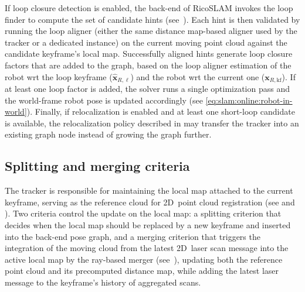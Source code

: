 If loop closure detection is enabled, the back-end of RicoSLAM invokes the loop
finder to compute the set of candidate hints
(see~).
Each hint is then validated by running the loop aligner (either the same
distance map-based aligner used by the tracker or a dedicated instance)
on the current moving point cloud against the candidate keyframe's local
map. Successfully aligned hints generate loop closure factors that are added
to the graph, based on the loop aligner estimation of the robot \gls{wrt} the
loop keyframe ($\hat{\mathbf{x}}_{R,\ell}$) and the robot \gls{wrt} the current
one ($\mathbf{x}_{R,\mathrm{kf}}$).
If at least one loop factor is added,
the solver runs a single optimization pass and the world-frame robot pose
is updated accordingly (see \eqref{eq:slam:online:robot-in-world}).
Finally, if relocalization is enabled and at least one
short-loop candidate is available, the relocalization policy described in
 may transfer the tracker into an
existing graph node instead of growing the graph further.

\subsection{Splitting and merging criteria}
\label{sec:slam:online:splitting-merging}

The tracker is responsible for maintaining the local map attached to
the current keyframe, serving as the reference cloud for 2D~point cloud
registration (see  and
). Two criteria control
the update on the local map: a splitting criterion that decides when
the local map should be replaced by a new keyframe and inserted into
the back-end pose graph, and a merging criterion that triggers
the integration of the moving cloud from the latest 2D~laser scan message into
the active local map by the ray-based merger
(see~), updating both
the reference point cloud and its precomputed distance map, while adding
the latest laser message to the keyframe's history of aggregated scans.


